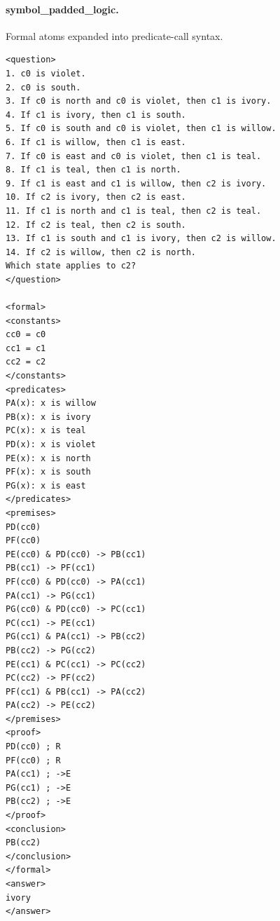 \documentclass[10pt]{article}
\begin{document}
\paragraph{symbol\_padded\_logic.} Formal atoms expanded into predicate-call syntax.
\begin{verbatim}
<question>
1. c0 is violet.
2. c0 is south.
3. If c0 is north and c0 is violet, then c1 is ivory.
4. If c1 is ivory, then c1 is south.
5. If c0 is south and c0 is violet, then c1 is willow.
6. If c1 is willow, then c1 is east.
7. If c0 is east and c0 is violet, then c1 is teal.
8. If c1 is teal, then c1 is north.
9. If c1 is east and c1 is willow, then c2 is ivory.
10. If c2 is ivory, then c2 is east.
11. If c1 is north and c1 is teal, then c2 is teal.
12. If c2 is teal, then c2 is south.
13. If c1 is south and c1 is ivory, then c2 is willow.
14. If c2 is willow, then c2 is north.
Which state applies to c2?
</question>

<formal>
<constants>
cc0 = c0
cc1 = c1
cc2 = c2
</constants>
<predicates>
PA(x): x is willow
PB(x): x is ivory
PC(x): x is teal
PD(x): x is violet
PE(x): x is north
PF(x): x is south
PG(x): x is east
</predicates>
<premises>
PD(cc0)
PF(cc0)
PE(cc0) & PD(cc0) -> PB(cc1)
PB(cc1) -> PF(cc1)
PF(cc0) & PD(cc0) -> PA(cc1)
PA(cc1) -> PG(cc1)
PG(cc0) & PD(cc0) -> PC(cc1)
PC(cc1) -> PE(cc1)
PG(cc1) & PA(cc1) -> PB(cc2)
PB(cc2) -> PG(cc2)
PE(cc1) & PC(cc1) -> PC(cc2)
PC(cc2) -> PF(cc2)
PF(cc1) & PB(cc1) -> PA(cc2)
PA(cc2) -> PE(cc2)
</premises>
<proof>
PD(cc0) ; R
PF(cc0) ; R
PA(cc1) ; ->E
PG(cc1) ; ->E
PB(cc2) ; ->E
</proof>
<conclusion>
PB(cc2)
</conclusion>
</formal>
<answer>
ivory
</answer>
\end{verbatim}
\end{document}
